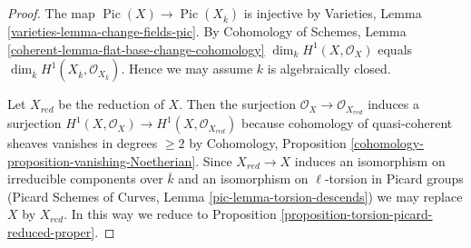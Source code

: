 \documentclass[10pt,a4paper]{amsart}
\theoremstyle{plain}
\theoremstyle{definition}
\theoremstyle{remark}
\numberwithin{equation}{subsection}
\def\Pic{\mathop{\mathrm{Pic}}\nolimits}
\begin{document}
\begin{proof}
The map $\Pic(X) \to \Pic(X_{\overline{k}})$
is injective by Varieties, Lemma \ref{varieties-lemma-change-fields-pic}.
By Cohomology of Schemes, Lemma \ref{coherent-lemma-flat-base-change-cohomology}
$\dim_k H^1(X, \mathcal{O}_X)$ equals
$\dim_{\overline{k}} H^1(X_{\overline{k}}, \mathcal{O}_{X_{\overline{k}}})$.
Hence we may assume $k$ is algebraically closed.

\medskip\noindent
Let $X_{red}$ be the reduction of $X$. Then the surjection
$\mathcal{O}_X \to \mathcal{O}_{X_{red}}$ induces a surjection
$H^1(X, \mathcal{O}_X) \to H^1(X, \mathcal{O}_{X_{red}})$
because cohomology of quasi-coherent sheaves vanishes in degrees
$\geq 2$ by
Cohomology, Proposition \ref{cohomology-proposition-vanishing-Noetherian}.
Since $X_{red} \to X$ induces an isomorphism on irreducible
components over $\overline{k}$ and an isomorphism on
$\ell$-torsion in Picard groups
(Picard Schemes of Curves, Lemma \ref{pic-lemma-torsion-descends})
we may replace $X$ by $X_{red}$. In this way we reduce to
Proposition \ref{proposition-torsion-picard-reduced-proper}.
\end{proof}
\end{document}
